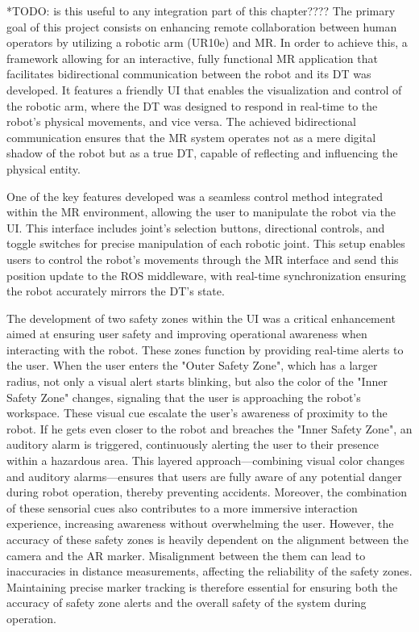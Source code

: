 *TODO: is this useful to any integration part of this chapter???? 
The primary goal of this project consists on enhancing remote collaboration between human operators by utilizing a robotic arm (UR10e) and \ac{MR}. In order to achieve this, a framework allowing for an interactive, fully functional \ac{MR} application that facilitates bidirectional communication between the robot and its \ac{DT} was developed. It features a friendly \ac{UI} that enables the visualization and control of the robotic arm, where the \ac{DT} was designed to respond in real-time to the robot's physical movements, and vice versa. The achieved bidirectional communication ensures that the \ac{MR} system operates not as a mere digital shadow of the robot but as a true \ac{DT}, capable of reflecting and influencing the physical entity.

One of the key features developed was a seamless control method integrated within the \ac{MR} environment, allowing the user to manipulate the robot via the \ac{UI}. This interface includes joint's selection buttons, directional controls, and toggle switches for precise manipulation of each robotic joint.  This setup enables users to control the robot's movements through the \ac{MR} interface and send this position update to the \ac{ROS} middleware, with real-time synchronization ensuring the robot accurately mirrors the \ac{DT}'s state.

The development of two safety zones within the \ac{UI} was a critical enhancement aimed at ensuring user safety and improving operational awareness when interacting with the robot. These zones function by providing real-time alerts to the user. When the user enters the "Outer Safety Zone", which has a larger radius, not only a visual alert starts blinking, but also the color of the "Inner Safety Zone" changes, signaling that the user is approaching the robot's workspace. These visual cue escalate the user's awareness of proximity to the robot. If he gets even closer to the robot and breaches the "Inner Safety Zone", an auditory alarm is triggered, continuously alerting the user to their presence within a hazardous area. This layered approach—combining visual color changes and auditory alarms—ensures that users are fully aware of any potential danger during robot operation, thereby preventing accidents. Moreover, the combination of these sensorial cues also contributes to a more immersive interaction experience, increasing awareness without overwhelming the user.
However, the accuracy of these safety zones is heavily dependent on the alignment between the camera and the \ac{AR} marker. Misalignment between the them can lead to inaccuracies in distance measurements, affecting the reliability of the safety zones. Maintaining precise marker tracking is therefore essential for ensuring both the accuracy of safety zone alerts and the overall safety of the system during operation.

